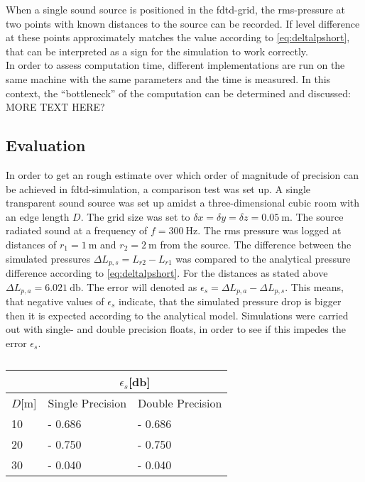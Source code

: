 When a single sound source is positioned in the \gls{fdtd}-grid, the \gls{rms}-pressure at two points with known distances to the source can be recorded. If level difference at these points approximately matches the value according to \autoref{eq:deltalpshort}, that can be interpreted as a sign for the simulation to work correctly.\\
In order to assess computation time, different implementations are run on the same machine with the same parameters and the time is measured. In this context, the ``bottleneck'' of the computation can be determined and discussed: MORE TEXT HERE?
\subsection{Evaluation}\label{ssec:evaluation}
In order to get an rough estimate over which order of magnitude of precision can be achieved in \gls{fdtd}-simulation, a comparison test was set up. A single transparent sound source was set up amidst a three-dimensional cubic room with an edge length $D$. The grid size was set to $\delta x=\delta y=\delta z = \SI{0.05}{\meter}$. The source radiated sound at a frequency of $f=\SI{300}{\hertz}$. The \gls{rms} pressure was logged at distances of $r_1=\SI{1}{\meter}$ and $r_2=\SI{2}{\meter}$ from the source. The difference between the simulated pressures $\Delta L_{p,s}=L_{r2}-L_{r1}$ was compared to the analytical pressure difference according to \autoref{eq:deltalpshort}. For the distances as stated above $\Delta L_{p,a}=\SI{6.021}{\decibel}$. The error will denoted as $\epsilon_{s}=\Delta L_{p,a} - \Delta L_{p,s}$. This means, that negative values of $\epsilon_{s}$ indicate, that the simulated pressure drop is bigger then it is expected according to the analytical model. Simulations were carried out with single- and double precision floats, in order to see if this impedes the error $\epsilon_s$.
\begin{table}[]
\centering
\caption{}
\label{tab:pressure_difference}
\begin{tabular}{l|l|l}
      & \multicolumn{2}{c}{\(\epsilon_s\)[\si{\decibel}]} \\ \hline
\(D\)[\si{\meter}] & Single Precision & Double Precision \\ \hline
10    & - 0.686          & - 0.686          \\ \hline
20    & - 0.750          & - 0.750          \\ \hline
30    & - 0.040          & - 0.040         
\end{tabular}
\end{table} 


